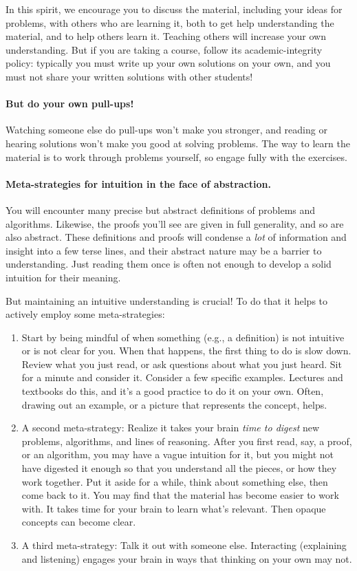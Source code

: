 \documentclass[11pt]{article}
\begin{document}
In this spirit, we encourage you to discuss the material, including your ideas for problems, with others who are learning it,
both to get help understanding the material, and to help others learn it.
Teaching others will increase your own understanding.
But if you are taking a course, follow its academic-integrity policy: typically you must write up your own solutions on your own, and you must not share your written solutions with other students!

\paragraph{But do your own pull-ups!}
Watching someone else do pull-ups won't make you stronger, and reading or hearing solutions won't make you good at solving problems.  The way to learn the material is to work through problems yourself, so engage fully with the exercises.

\paragraph{Meta-strategies for intuition in the face of abstraction.}
You will encounter many precise but abstract definitions of problems and algorithms.  Likewise, the proofs you'll see are given in full generality, and so are also abstract.  These definitions and proofs will condense a \emph{lot} of information and insight into a few terse lines, and their abstract nature may be a barrier to understanding.  Just reading them once is often not enough to develop a solid intuition for their meaning.

But maintaining an intuitive understanding is crucial!  To do that it helps to actively employ some meta-strategies:

\begin{enumerate}
\item Start by being mindful of when something (e.g., a definition) is not intuitive or is not clear for you.  When that happens, the first thing to do is slow down.  Review what you just read, or ask questions about what you just heard. Sit for a minute and consider it.   Consider a few specific examples.  Lectures and textbooks do this, and it's a good practice to do it on your own.  Often, drawing out an example, or a picture that represents the concept, helps.

\item
  A second meta-strategy:  Realize it takes your brain \emph{time to digest} new problems, algorithms, and lines of reasoning.  After you first read, say, a proof, or an algorithm, you may have a vague intuition for it, but you might not have digested it enough so that you understand all the pieces, or how they work together.  Put it aside for a while, think about something else, then come back to it. You may find that the material has become easier to work with.  It takes time for your brain to learn what's relevant.  Then opaque concepts can become clear.

\item
A third meta-strategy:  Talk it out with someone else.  Interacting (explaining and listening) engages your brain in ways that thinking on your own may not.  
\end{enumerate}
\end{document}
